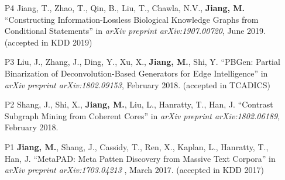 \documentclass[10pt]{article}
\newenvironment{myindentpar}[1]%
{\begin{list}{}%
         {\setlength{\leftmargin}{#1}}%
         \item[]%
}
{\end{list}}
\newcounter{list}
\begin{document}
\begin{myindentpar}{0.00cm}
{\begin{enumerate}[leftmargin=.5cm]
\item[P4] Jiang, T., Zhao, T., Qin, B., Liu, T., Chawla, N.V., \textbf{Jiang, M.} ``Constructing Information-Lossless Biological Knowledge Graphs from Conditional Statements'' in \textit{arXiv preprint arXiv:1907.00720}, June 2019. (accepted in KDD 2019)
		
\item[P3] Liu, J., Zhang, J., Ding, Y., Xu, X., \textbf{Jiang, M.}, Shi, Y. ``PBGen: Partial Binarization of Deconvolution-Based Generators for Edge Intelligence'' in \textit{arXiv preprint arXiv:1802.09153}, February 2018. (accepted in TCADICS)
		
\item[P2] Shang, J., Shi, X., \textbf{Jiang, M.}, Liu, L., Hanratty, T., Han, J. ``Contrast Subgraph Mining from Coherent Cores'' in \textit{arXiv preprint arXiv:1802.06189}, February 2018.

\item[P1] \textbf{Jiang, M.}, Shang, J., Cassidy, T., Ren, X., Kaplan, L., Hanratty, T., Han, J. ``MetaPAD: Meta Patten Discovery from Massive Text Corpora'' in \textit{arXiv preprint arXiv:1703.04213 }, March 2017. (accepted in KDD 2017)

\end{enumerate}
}

\end{myindentpar}






\end{document}
